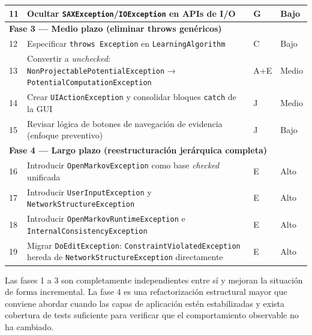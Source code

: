 \documentclass[11pt,a4paper]{article}
\begin{document}
\begin{longtable}{p{0.4cm}p{8.5cm}p{2.5cm}p{2cm}}
    11 & Ocultar \texttt{SAXException}/\texttt{IOException} en APIs de I/O & G & Bajo \\
    \midrule
    \multicolumn{4}{l}{\textbf{Fase 3 — Medio plazo (eliminar throws genéricos)}} \\
    \midrule
    12 & Especificar \texttt{throws Exception} en \texttt{LearningAlgorithm} & C & Bajo \\
    13 & Convertir a \textit{unchecked}: \texttt{NonProjectablePotentialException} → \texttt{PotentialComputationException} & A+E & Medio \\
    14 & Crear \texttt{UIActionException} y consolidar bloques \texttt{catch} de la GUI & J & Medio \\
    15 & Revisar lógica de botones de navegación de evidencia (enfoque preventivo) & J & Bajo \\
    \midrule
    \multicolumn{4}{l}{\textbf{Fase 4 — Largo plazo (reestructuración jerárquica completa)}} \\
    \midrule
    16 & Introducir \texttt{OpenMarkovException} como base \textit{checked} unificada & E & Alto \\
    17 & Introducir \texttt{UserInputException} y \texttt{NetworkStructureException} & E & Alto \\
    18 & Introducir \texttt{OpenMarkovRuntimeException} e \texttt{InternalConsistencyException} & E & Alto \\
    19 & Migrar \texttt{DoEditException}: \texttt{ConstraintViolatedException} hereda de \texttt{NetworkStructureException} directamente & E & Alto \\
    \bottomrule
\end{longtable}

Las fases 1 a 3 son completamente independientes entre sí y mejoran la situación de forma
incremental. La fase 4 es una refactorización estructural mayor que conviene abordar cuando
las capas de aplicación estén estabilizadas y exista cobertura de tests suficiente para
verificar que el comportamiento observable no ha cambiado.
\end{document}
